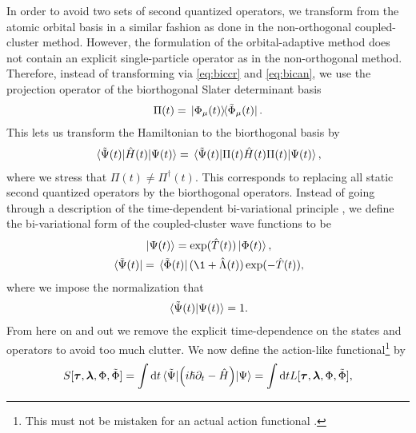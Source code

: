         In order to avoid two sets of second quantized operators, we
        transform from the atomic orbital basis in a similar fashion as done
        in the non-orthogonal coupled-cluster method.
        However, the formulation of the orbital-adaptive method does not
        contain an explicit single-particle operator as in the
        non-orthogonal method.
        Therefore, instead of transforming via \autoref{eq:biccr} and
        \autoref{eq:bican}, we use the projection operator of the
        biorthogonal Slater determinant basis \cite{kvaal2012ab}
        \begin{align}
            \Pi(t)
            = \dyad*{\slat_{\mu}(t)}{\tilde{\slat}_{\mu}(t)}.
        \end{align}
        This lets us transform the Hamiltonian to the biorthogonal basis by
        \begin{align}
            \mel*{\tilde{\Psi}(t)}{\hat{H}(t)}{\Psi(t)}
            =
            \mel*{\tilde{\Psi}(t)}{\Pi(t)\hat{H}(t)\Pi(t)}{\Psi(t)},
        \end{align}
        where we stress that $\Pi(t) \neq \Pi^{\dagger}(t)$.  This
        corresponds to replacing all static second quantized operators by
        the biorthogonal operators.
        Instead of going through a description of the time-dependent
        bi-variational principle \cite{kvaal2012ab, arponen1983311}, we
        define the bi-variational form of the coupled-cluster wave functions
        to be
        \begin{gather}
            \ket*{\Psi(t)} = \exponential(\clust(t))\ket*{\slat(t)}, \\
            \bra*{\tilde{\Psi}(t)}
            = \bra*{\tilde{\slat}(t)}(\1 + \clustl(t))
            \exponential(-\clust(t)),
        \end{gather}
        where we impose the normalization that
        \begin{align}
            \braket*{\tilde{\Psi}(t)}{\Psi(t)} = 1.
        \end{align}
        From here on and out we remove the explicit time-dependence on the
        states and operators to avoid too much clutter.
        We now define the action-like functional\footnote{%
            This must not be mistaken for an actual action functional
            \cite{arponen1983311}.
        } by \cite{kvaal2012ab, arponen1983311}
        \begin{align}
            S[\boldsymbol{\tau}, \boldsymbol{\lambda}, \Phi, \tilde{\Phi}]
            =
            \int \dd t
            \mel*{\tilde{\Psi}}{
                \left( 
                    i\hslash\partial_t - \hat{H}
                 \right)
            }{\Psi}
            =
            \int \dd t
            L[\boldsymbol{\tau}, \boldsymbol{\lambda}, \Phi, \tilde{\Phi}],
            \label{eq:oacc-action-functional}
        \end{align}

